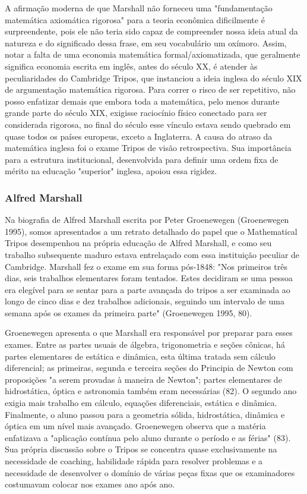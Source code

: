 \documentclass[a4paper,12pt]{article}[abntex2]
\begin{document}
A afirmação moderna de que Marshall não forneceu uma "fundamentação matemática axiomática rigorosa" para a teoria econômica dificilmente é surpreendente, pois ele não teria sido capaz de compreender nossa ideia atual da natureza e do significado dessa frase, em seu vocabulário um oxímoro. Assim, notar a falta de uma economia matemática formal/axiomatizada, que geralmente significa economia escrita em inglês, antes do século XX, é atender às peculiaridades do Cambridge Tripos, que instanciou a ideia inglesa do século XIX de argumentação matemática rigorosa. Para correr o risco de ser repetitivo, não posso enfatizar demais que embora toda a matemática, pelo menos durante grande parte do século XIX, exigisse raciocínio físico conectado para ser considerada rigorosa, no final do século esse vínculo estava sendo quebrado em quase todos os países europeus, exceto a Inglaterra. A causa do atraso da matemática inglesa foi o exame Tripos de visão retrospectiva. Sua importância para a estrutura institucional, desenvolvida para definir uma ordem fixa de mérito na educação "superior" inglesa, apoiou essa rigidez.

\subsubsection{\textbf{Alfred Marshall}}
Na biografia de Alfred Marshall escrita por Peter Groenewegen (Groenewegen 1995), somos apresentados a um retrato detalhado do papel que o Mathematical Tripos desempenhou na própria educação de Alfred Marshall, e como seu trabalho subsequente maduro estava entrelaçado com essa instituição peculiar de Cambridge. Marshall fez o exame em sua forma pós-1848: "Nos primeiros três dias, seis trabalhos elementares foram tentados. Estes decidiram se uma pessoa era elegível para se sentar para a parte avançada do tripos a ser examinada ao longo de cinco dias e dez trabalhos adicionais, seguindo um intervalo de uma semana após os exames da primeira parte" (Groenewegen 1995, 80).

Groenewegen apresenta o que Marshall era responsável por preparar para esses exames. Entre as partes usuais de álgebra, trigonometria e seções cônicas, há partes elementares de estática e dinâmica, esta última tratada sem cálculo diferencial; as primeiras, segunda e terceira seções do Principia de Newton com proposições "a serem provadas à maneira de Newton"; partes elementares de hidrostática, óptica e astronomia também eram necessárias (82). O segundo ano exigia mais trabalho em cálculo, equações diferenciais, estática e dinâmica. Finalmente, o aluno passou para a geometria sólida, hidrostática, dinâmica e óptica em um nível mais avançado. Groenewegen observa que a matéria enfatizava a "aplicação contínua pelo aluno durante o período e as férias" (83). Sua própria discussão sobre o Tripos se concentra quase exclusivamente na necessidade de coaching, habilidade rápida para resolver problemas e a necessidade de desenvolver o domínio de várias peças fixas que os examinadores costumavam colocar nos exames ano após ano.
\end{document}
